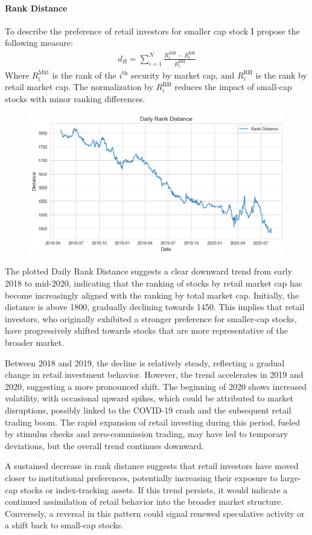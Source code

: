 \paragraph{Rank Distance} 
To describe the preference of retail investors for smaller cap stock I propose the following measure:
\begin{align*}
    d_R = \sum_{i=1}^N \frac{R^{\text{Mkt}}_i-R^{\text{RH}}_i}{R^{\text{RH}}_i}
\end{align*}
Where $R^{\text{Mkt}}_i$ is the rank of the $i^\text{th}$ security by market cap, and $R^{\text{RH}}_i$ is the rank by retail market cap. The normalization by $R^{\text{RH}}_i$ reduces the impact of small-cap stocks with minor ranking differences.

\begin{figure}[h]
        \centering
        \includegraphics[width=0.8\linewidth]{../images/rank_distance.png}
\end{figure}

The plotted Daily Rank Distance suggests a clear downward trend from early 2018 to mid-2020, indicating that the ranking of stocks by retail market cap has become increasingly aligned with the ranking by total market cap. Initially, the distance is above 1800, gradually declining towards 1450. This implies that retail investors, who originally exhibited a stronger preference for smaller-cap stocks, have progressively shifted towards stocks that are more representative of the broader market.

Between 2018 and 2019, the decline is relatively steady, reflecting a gradual change in retail investment behavior. However, the trend accelerates in 2019 and 2020, suggesting a more pronounced shift. The beginning of 2020 shows increased volatility, with occasional upward spikes, which could be attributed to market disruptions, possibly linked to the COVID-19 crash and the subsequent retail trading boom. The rapid expansion of retail investing during this period, fueled by stimulus checks and zero-commission trading, may have led to temporary deviations, but the overall trend continues downward.

A sustained decrease in rank distance suggests that retail investors have moved closer to institutional preferences, potentially increasing their exposure to large-cap stocks or index-tracking assets. If this trend persists, it would indicate a continued assimilation of retail behavior into the broader market structure. Conversely, a reversal in this pattern could signal renewed speculative activity or a shift back to small-cap stocks.
